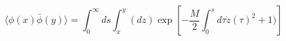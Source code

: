\begin{equation}
\label{green}
\langle \phi (x)\bar{\phi}(y)\rangle = \int_0^{\infty}ds \int_x^y (dz) \exp [-\frac{M}{2}\int_0^{s}d\tau \dot{z}(\tau )^2+1)]
\end{equation}

